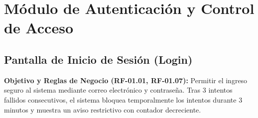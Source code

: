 \documentclass[12pt,a4paper]{report}
\begin{document}
\newpage
\chapter{Módulo de Autenticación y Control de Acceso}

\section{Pantalla de Inicio de Sesión (Login)}

\textbf{Objetivo y Reglas de Negocio (RF-01.01, RF-01.07):} Permitir el ingreso seguro al sistema mediante correo electrónico y contraseña. Tras 3 intentos fallidos consecutivos, el sistema bloquea temporalmente los intentos durante 3 minutos y muestra un aviso restrictivo con contador decreciente.
\end{document}
